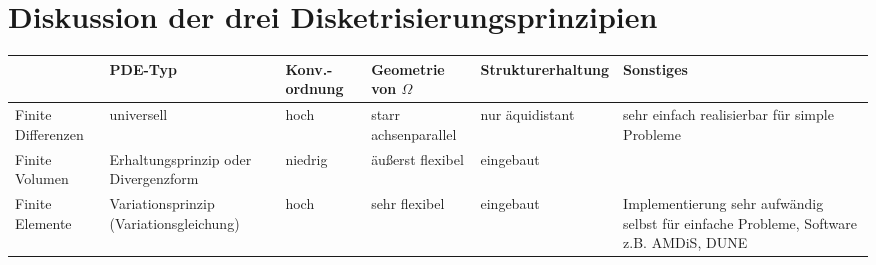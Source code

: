 \section{Diskussion der drei Disketrisierungsprinzipien} %
\begin{footnotesize}
\begin{tabular}{p{4.5em}|p{9em}|p{4em}|p{4.5em}|p{5em}|p{12em}}
  & PDE-Typ
  & Konv.-ordnung
  & Geometrie von $\Omega$
  & Struktur\-erhaltung
  & Sonstiges
  \\
  \hline
  Finite Differenzen
  & universell
  & hoch
  & starr achsenparallel
  & nur äquidistant
  & sehr einfach realisierbar für simple Probleme
  \\
  \hline
  Finite Volumen
  & Erhaltungsprinzip oder Divergenzform
  & niedrig
  & äußerst flexibel
  & eingebaut
  & 
  \\
  \hline
  Finite Elemente
  & Variationsprinzip (Variationsgleichung)
  & hoch
  & sehr flexibel
  & eingebaut
  & Implementierung sehr aufwändig selbst für einfache Probleme,
    Software z.B. AMDiS, DUNE
  \\
\end{tabular}
\end{footnotesize}